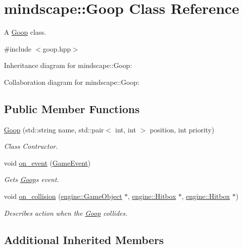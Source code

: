 \hypertarget{classmindscape_1_1_goop}{}\section{mindscape\+:\+:Goop Class Reference}
\label{classmindscape_1_1_goop}


A \hyperlink{classmindscape_1_1_goop}{Goop} class.  




{\ttfamily \#include $<$goop.\+hpp$>$}



Inheritance diagram for mindscape\+:\+:Goop\+:


Collaboration diagram for mindscape\+:\+:Goop\+:
\subsection*{Public Member Functions}
\begin{DoxyCompactItemize}
\item 
\hyperlink{classmindscape_1_1_goop_a2875ad29c31b4f038c91048c2599630a}{Goop} (std\+::string name, std\+::pair$<$ int, int $>$ position, int priority)
\begin{DoxyCompactList}\small\item\em Class Contructor. \end{DoxyCompactList}\item 
void \hyperlink{classmindscape_1_1_goop_af4f468308a49c1055063dede23688eaf}{on\+\_\+event} (\hyperlink{class_game_event}{Game\+Event})
\begin{DoxyCompactList}\small\item\em Gets \hyperlink{classmindscape_1_1_goop}{Goop}\textquotesingle{}s event. \end{DoxyCompactList}\item 
void \hyperlink{classmindscape_1_1_goop_ad3c2ddd5849565484fa4ffeaf3fd8e42}{on\+\_\+collision} (\hyperlink{classengine_1_1_game_object}{engine\+::\+Game\+Object} $\ast$, \hyperlink{classengine_1_1_hitbox}{engine\+::\+Hitbox} $\ast$, \hyperlink{classengine_1_1_hitbox}{engine\+::\+Hitbox} $\ast$)
\begin{DoxyCompactList}\small\item\em Describes action when the \hyperlink{classmindscape_1_1_goop}{Goop} collides. \end{DoxyCompactList}\end{DoxyCompactItemize}
\subsection*{Additional Inherited Members}


